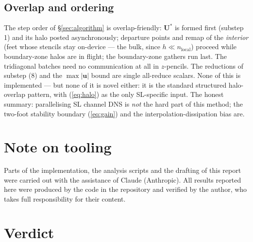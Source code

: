 \documentclass[11pt,a4paper]{article}
\newcommand{\bu}{\mathbf{u}}
\newcommand{\bU}{\mathbf{U}}
\begin{document}
\subsection{Overlap and ordering}

The step order of \S\ref{sec:algorithm} is overlap-friendly: $\bU^{*}$ is
formed first (substep 1) and its halo posted asynchronously; departure points
and remap of the \emph{interior} (feet whose stencils stay on-device ---
the bulk, since $h\ll n_{\mathrm{local}}$) proceed while boundary-zone halos
are in flight; the boundary-zone gathers run last. The tridiagonal batches
need no communication at all in $z$-pencils. The reductions of substep (8)
and the $\max|\bu|$ bound are single all-reduce scalars. None of this is
implemented --- but none of it is novel either: it is the standard structured
halo-overlap pattern, with (\ref{eq:halo}) as the only SL-specific input.
The honest summary: parallelising SL channel DNS is \emph{not} the hard part
of this method; the two-foot stability boundary (\ref{eq:gain}) and the
interpolation-dissipation bias are.

\section*{Note on tooling}
Parts of the implementation, the analysis scripts and the drafting of this
report were carried out with the assistance of Claude (Anthropic). All results
reported here were produced by the code in the repository and verified by the
author, who takes full responsibility for their content.

\section{Verdict}
\end{document}
